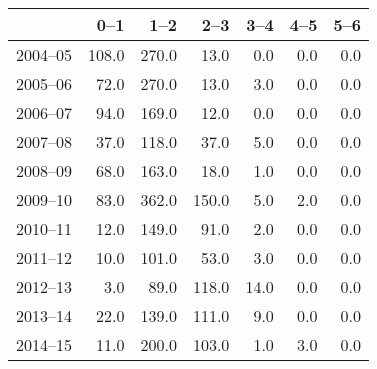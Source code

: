 \begin{table}[ht]
\centering
\begin{tabular}{rrrrrrr}
  \hline
 & 0--1 & 1--2 & 2--3 & 3--4 & 4--5 & 5--6 \\ 
  \hline
2004--05 & 108.0 & 270.0 & 13.0 & 0.0 & 0.0 & 0.0 \\ 
  2005--06 & 72.0 & 270.0 & 13.0 & 3.0 & 0.0 & 0.0 \\ 
  2006--07 & 94.0 & 169.0 & 12.0 & 0.0 & 0.0 & 0.0 \\ 
  2007--08 & 37.0 & 118.0 & 37.0 & 5.0 & 0.0 & 0.0 \\ 
  2008--09 & 68.0 & 163.0 & 18.0 & 1.0 & 0.0 & 0.0 \\ 
  2009--10 & 83.0 & 362.0 & 150.0 & 5.0 & 2.0 & 0.0 \\ 
  2010--11 & 12.0 & 149.0 & 91.0 & 2.0 & 0.0 & 0.0 \\ 
  2011--12 & 10.0 & 101.0 & 53.0 & 3.0 & 0.0 & 0.0 \\ 
  2012--13 & 3.0 & 89.0 & 118.0 & 14.0 & 0.0 & 0.0 \\ 
  2013--14 & 22.0 & 139.0 & 111.0 & 9.0 & 0.0 & 0.0 \\ 
  2014--15 & 11.0 & 200.0 & 103.0 & 1.0 & 3.0 & 0.0 \\ 
   \hline
\end{tabular}
\end{table}

